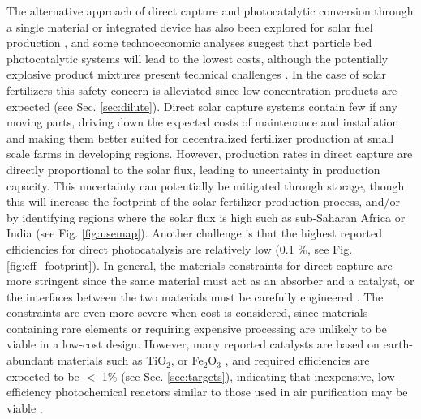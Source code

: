 The alternative approach of direct capture and photocatalytic conversion through a single material or integrated device has also been explored for solar fuel production \cite{Montoya_2017, Lewis_2016, Pinaud_2013}, and some technoeconomic analyses suggest that particle bed photocatalytic systems will lead to the lowest costs, although the potentially explosive product mixtures present technical challenges \cite{Pinaud_2013}. In the case of solar fertilizers this safety concern is alleviated since low-concentration products are expected (see Sec. \ref{sec:dilute}). Direct solar capture systems contain few if any moving parts, driving down the expected costs of maintenance and installation and making them better suited for decentralized fertilizer production at small scale farms in developing regions. However, production rates in direct capture are directly proportional to the solar flux, leading to uncertainty in production capacity. This uncertainty can potentially be mitigated through storage, though this will increase the footprint of the solar fertilizer production process, and/or by identifying regions where the solar flux is high such as sub-Saharan Africa or India (see Fig. \ref{fig:usemap}). Another challenge is that the highest reported efficiencies for direct photocatalysis are relatively low (0.1 \%, see Fig. \ref{fig:eff_footprint}). In general, the materials constraints for direct capture are more stringent since the same material must act as an absorber and a catalyst, or the interfaces between the two materials must be carefully engineered \cite{Montoya_2017}. The constraints are even more severe when cost is considered, since materials containing rare elements or requiring expensive processing are unlikely to be viable in a low-cost design. However, many reported catalysts are based on earth-abundant materials such as TiO$_2$, or Fe$_2$O$_3$ \cite{FUJISHIMA_1972,Hardee_1976,Medford_2017}, and required efficiencies are expected to be $<$ 1\% (see Sec. \ref{sec:targets}), indicating that inexpensive, low-efficiency photochemical reactors similar to those used in air purification may be viable \cite{Birnie2006, Bhatkhande_2001,Parkin_2005}.

